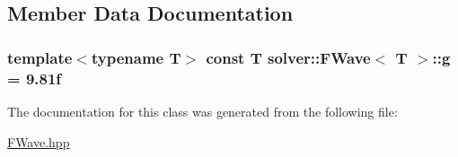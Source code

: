 \subsection{Member Data Documentation}
\hypertarget{classsolver_1_1FWave_ac3884c16c1822530961884e9f52304a2}{}
\subsubsection[{g}]{\setlength{\rightskip}{0pt plus 5cm}template$<$typename T$>$ const T {\bf solver\+::\+F\+Wave}$<$ T $>$\+::g = 9.\+81f\hspace{0.3cm}{\ttfamily [static]}}\label{classsolver_1_1FWave_ac3884c16c1822530961884e9f52304a2}


The documentation for this class was generated from the following file\+:\begin{DoxyCompactItemize}
\item 
\hyperlink{FWave_8hpp}{F\+Wave.\+hpp}\end{DoxyCompactItemize}
